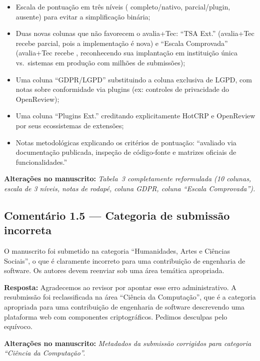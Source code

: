\documentclass[11pt,a4paper]{article}
\newcommand{\response}[1]{\par\noindent\textcolor{responsecolor}{\textbf{Resposta:}} #1}
\newcommand{\change}[1]{\par\noindent\textcolor{changecolor}{\textbf{Alterações no manuscrito:}} \textit{#1}}
\begin{document}
\begin{itemize}[nosep]
  \item Escala de pontuação em três níveis ( completo/nativo,  parcial/plugin,  ausente) para evitar a simplificação binária;
  \item Duas novas colunas que não favorecem o avalia+Tec: ``TSA Ext.'' (avalia+Tec recebe  parcial, pois a implementação é nova) e ``Escala Comprovada'' (avalia+Tec recebe , reconhecendo sua implantação em instituição única vs.\ sistemas em produção com milhões de submissões);
  \item Uma coluna ``GDPR/LGPD'' substituindo a coluna exclusiva de LGPD, com notas sobre conformidade via plugins (ex: controles de privacidade do OpenReview);
  \item Uma coluna ``Plugins Ext.'' creditando explicitamente HotCRP e OpenReview por seus ecossistemas de extensões;
  \item Notas metodológicas explicando os critérios de pontuação: ``avaliado via documentação publicada, inspeção de código-fonte e matrizes oficiais de funcionalidades.''
\end{itemize}

\change{Tabela~3 completamente reformulada (10 colunas, escala de 3 níveis, notas de rodapé, coluna GDPR, coluna ``Escala Comprovada'').}

\bigskip

\subsection*{Comentário 1.5 --- Categoria de submissão incorreta}

\begin{reviewerbox}
O manuscrito foi submetido na categoria ``Humanidades, Artes e Ciências Sociais'', o que é claramente incorreto para uma contribuição de engenharia de software. Os autores devem reenviar sob uma área temática apropriada.
\end{reviewerbox}

\response{Agradecemos ao revisor por apontar esse erro administrativo. A resubmissão foi reclassificada na área ``Ciência da Computação'', que é a categoria apropriada para uma contribuição de engenharia de software descrevendo uma plataforma web com componentes criptográficos. Pedimos desculpas pelo equívoco.}

\change{Metadados da submissão corrigidos para categoria ``Ciência da Computação''.}
\end{document}
